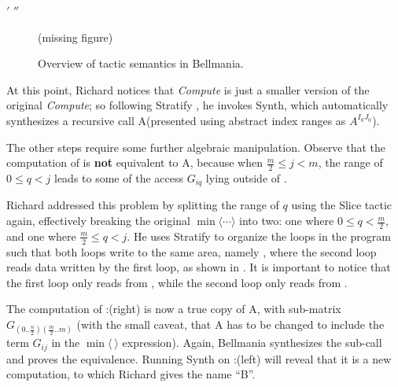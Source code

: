 \newbox\primebox
\setbox\primebox\hbox{$'$}
\newbox\doubleprimebox
\setbox\doubleprimebox\hbox{$''$}

\newcommand\primeocd[1]{\hspace{\wd\primebox}#1\usebox\primebox}
\newcommand\doubleprimeocd[1]{\hspace{\wd\doubleprimebox}#1\usebox\doubleprimebox}

\begin{figure}
\centering
\ifarmando
\bigskip(missing figure)\bigskip
\else

\vspace{-2mm}
\fi
\caption[caption]{\label{overview:slice-stratify-synth}
  Overview of tactic semantics in Bellmania. }
\end{figure}


\medskip
At this point, Richard notices that {\it Compute } is just a smaller version of
the original {\it Compute}; so following {\sf Stratify} , he invokes {\sf Synth}, which automatically
synthesizes a recursive call A
(presented using abstract index ranges as $A^{I_0J_0}$).

The other steps require some further algebraic manipulation.
Observe that the computation of  is {\bf not} equivalent to
A, 
because when $\frac{m}{2} \leq j < m$, the range of $0\leq q < j$ leads to
some of the access $G_{iq}$ lying outside of .

Richard addressed this problem by splitting the range of $q$ using the {\sf Slice}
tactic again, effectively breaking the original $\min\langle\cdots\rangle$ into two:
one where $0\leq q < \frac{m}{2}$,
and one where $\frac{m}{2}\leq q < j$. 
He uses {\sf Stratify} to organize the loops in the program such that both 
loops write to the same area, namely , where the second loop reads data
written by the first loop, as shown in .
It is important to notice that the first loop only reads from , 
while the second loop only reads from .

The computation of :(right) is now a true copy of A,
with sub-matrix $G_{(0..\frac{n}{2})(\frac{m}{2}..m)}$ (with the small caveat,
that A has to be changed to include the term $G_{ij}$ in the $\min\langle~\rangle$ expression).
Again, Bellmania synthesizes the sub-call and proves the equivalence.
Running {\sf Synth} on :(left) will reveal that it is a new computation,
to which Richard gives the name ``B''. 

